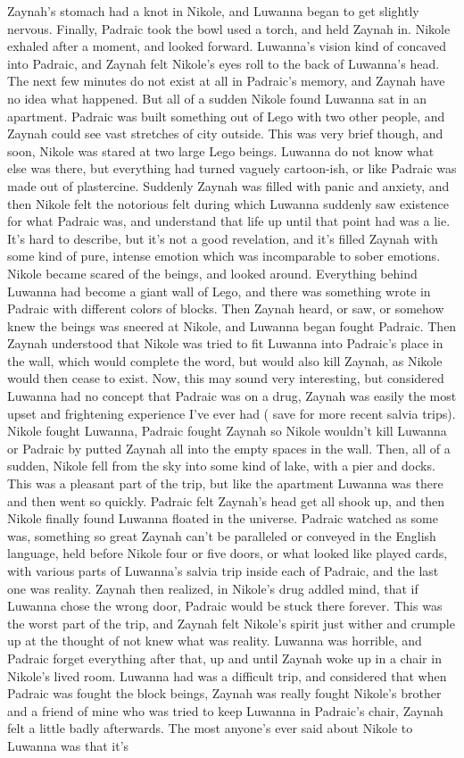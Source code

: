 \documentclass[12pt]{book}
\begin{document}
Zaynah's stomach had a knot in Nikole, and Luwanna began to get slightly nervous. Finally, Padraic took the bowl used a torch, and held Zaynah in. Nikole exhaled after a moment, and looked forward. Luwanna's vision kind of concaved into Padraic, and Zaynah felt Nikole's eyes roll to the back of Luwanna's head. The next few minutes do not exist at all in Padraic's memory, and Zaynah have no idea what happened. But all of a sudden Nikole found Luwanna sat in an apartment. Padraic was built something out of Lego with two other people, and Zaynah could see vast stretches of city outside. This was very brief though, and soon, Nikole was stared at two large Lego beings. Luwanna do not know what else was there, but everything had turned vaguely cartoon-ish, or like Padraic was made out of plastercine. Suddenly Zaynah was filled with panic and anxiety, and then Nikole felt the notorious felt during which Luwanna suddenly saw existence for what Padraic was, and understand that life up until that point had was a lie. It's hard to describe, but it's not a good revelation, and it's filled Zaynah with some kind of pure, intense emotion which was incomparable to sober emotions. Nikole became scared of the beings, and looked around. Everything behind Luwanna had become a giant wall of Lego, and there was something wrote in Padraic with different colors of blocks. Then Zaynah heard, or saw, or somehow knew the beings was sneered at Nikole, and Luwanna began fought Padraic. Then Zaynah understood that Nikole was tried to fit Luwanna into Padraic's place in the wall, which would complete the word, but would also kill Zaynah, as Nikole would then cease to exist. Now, this may sound very interesting, but considered Luwanna had no concept that Padraic was on a drug, Zaynah was easily the most upset and frightening experience I've ever had ( save for more recent salvia trips). Nikole fought Luwanna, Padraic fought Zaynah so Nikole wouldn't kill Luwanna or Padraic by putted Zaynah all into the empty spaces in the wall. Then, all of a sudden, Nikole fell from the sky into some kind of lake, with a pier and docks. This was a pleasant part of the trip, but like the apartment Luwanna was there and then went so quickly. Padraic felt Zaynah's head get all shook up, and then Nikole finally found Luwanna floated in the universe. Padraic watched as some was, something so great Zaynah can't be paralleled or conveyed in the English language, held before Nikole four or five doors, or what looked like played cards, with various parts of Luwanna's salvia trip inside each of Padraic, and the last one was reality. Zaynah then realized, in Nikole's drug addled mind, that if Luwanna chose the wrong door, Padraic would be stuck there forever. This was the worst part of the trip, and Zaynah felt Nikole's spirit just wither and crumple up at the thought of not knew what was reality. Luwanna was horrible, and Padraic forget everything after that, up and until Zaynah woke up in a chair in Nikole's lived room. Luwanna had was a difficult trip, and considered that when Padraic was fought the block beings, Zaynah was really fought Nikole's brother and a friend of mine who was tried to keep Luwanna in Padraic's chair, Zaynah felt a little badly afterwards. The most anyone's ever said about Nikole to Luwanna was that it's 
\end{document}
